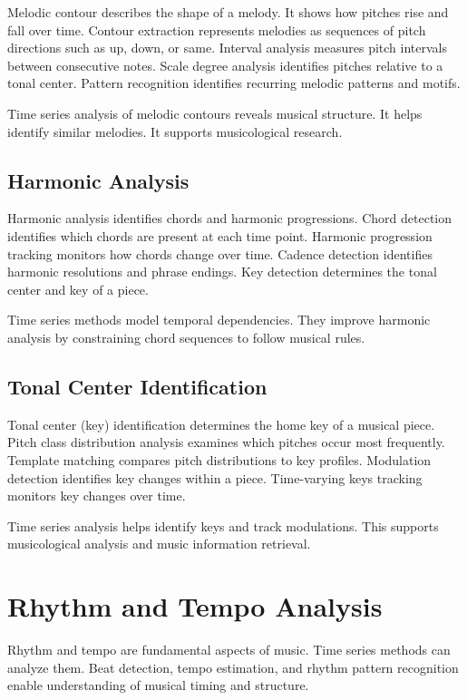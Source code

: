 Melodic contour describes the shape of a melody. It shows how pitches rise and fall over time. Contour extraction represents melodies as sequences of pitch directions such as up, down, or same. Interval analysis measures pitch intervals between consecutive notes. Scale degree analysis identifies pitches relative to a tonal center. Pattern recognition identifies recurring melodic patterns and motifs.

Time series analysis of melodic contours reveals musical structure. It helps identify similar melodies. It supports musicological research.

\subsection{Harmonic Analysis}

Harmonic analysis identifies chords and harmonic progressions. Chord detection identifies which chords are present at each time point. Harmonic progression tracking monitors how chords change over time. Cadence detection identifies harmonic resolutions and phrase endings. Key detection determines the tonal center and key of a piece.

Time series methods model temporal dependencies. They improve harmonic analysis by constraining chord sequences to follow musical rules.

\subsection{Tonal Center Identification}

Tonal center (key) identification determines the home key of a musical piece. Pitch class distribution analysis examines which pitches occur most frequently. Template matching compares pitch distributions to key profiles. Modulation detection identifies key changes within a piece. Time-varying keys tracking monitors key changes over time.

Time series analysis helps identify keys and track modulations. This supports musicological analysis and music information retrieval.

\section{Rhythm and Tempo Analysis}

Rhythm and tempo are fundamental aspects of music. Time series methods can analyze them. Beat detection, tempo estimation, and rhythm pattern recognition enable understanding of musical timing and structure.

